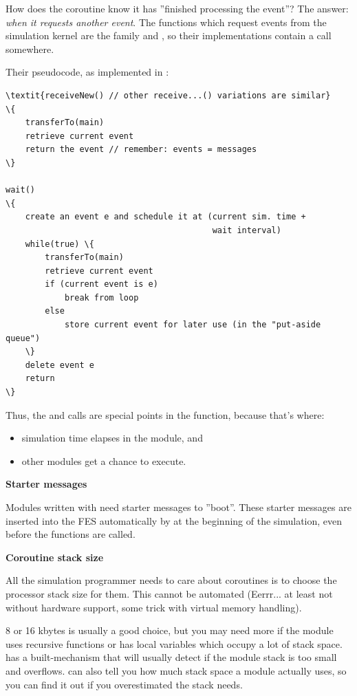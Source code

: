 How does the coroutine know it has ''finished processing the event''?
The answer: \textit{when it requests another event}.  The functions
which request events from the simulation kernel are the
 family and , so their
implementations contain a  call
somewhere.


Their pseudocode, as implemented in {\opp}:


\begin{Verbatim}[commandchars=\\\{\}]
\textit{receiveNew() // other receive...() variations are similar}
\{
    transferTo(main)
    retrieve current event
    return the event // remember: events = messages
\}

wait()
\{
    create an event e and schedule it at (current sim. time +
                                          wait interval)
    while(true) \{
        transferTo(main)
        retrieve current event
        if (current event is e)
            break from loop
        else
            store current event for later use (in the "put-aside queue")
    \}
    delete event e
    return
\}
\end{Verbatim}
  


Thus, the  and  calls are
special points in the  function, because that's
where:
\begin{itemize}
\item{simulation time elapses in the module, and}
\item{other modules get a chance to execute.}
\end{itemize}


\textbf{Starter messages}


Modules written with  need starter
messages to ''boot''.  These starter messages
are inserted into the FES automatically by {\opp} at the
beginning of the simulation, even before the 
functions are called.


\textbf{Coroutine stack size}


All the simulation programmer needs to care about coroutines is to
choose the processor stack size for them.
This cannot be automated (Eerrr... at least not without hardware
support, some trick with virtual memory handling).


8 or 16 kbytes is usually a good choice, but you may need more if the
module uses recursive functions or has local variables which occupy a
lot of stack space. {\opp} has a built-mechanism that will usually
detect if the module stack is too small and
overflows. {\opp} can also tell you how much
stack space a module actually uses, so you can find
it out if you overestimated the stack needs.


